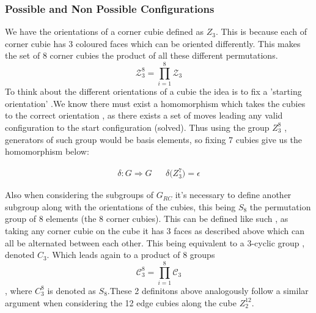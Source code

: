 \documentclass{article}
\begin{document}


\pagebreak
\subsubsection*{Possible and Non Possible Configurations}


We have the orientations of a corner cubie defined as $Z_3$.
This is because each of corner cubie has 3 coloured faces which can be oriented differently. 
This makes the set of 8 corner cubies the product of all these different permutations.\[\mathcal{Z}_{3}^8 = \prod_{i=1}^{8}\mathcal{Z}_{3}\]
To think about the different orientations of a cubie the idea is to fix a 'starting orientation' .We know there must exist a homomorphism which takes the cubies to the correct orientation , as there exists a set of moves leading any valid configuration to the start configuration (solved). Thus using the group $Z_{3}^{8}$ , generators of such group would be basis elements,  so fixing 7 cubies  give us the homomorphism below: 

\begin{align}
	\delta : G \Rightarrow G && \delta\mathcal({Z}_{3}^{7}) = \epsilon
\end{align}

Also when considering the subgroups of $G_{RC}$ it's necessary to define another subgroup along with the orientations of the cubies, this being $S_{8}$ the permutation group of 8 elements (the 8 corner cubies). This can be defined like such , as taking any corner cubie on the cube it has 3 faces as described above which can all be alternated between each other. This being equivalent to a 3-cyclic group , denoted $C_{3}$. Which leads again to a product of 8 groups \[\mathcal{C}_{3}^8 = \prod_{i=1}^{8}\mathcal{C}_{3}\], where $C_{3}^{8}$ is denoted as $S_{8}$.These 2 definitons above analogously follow a similar argument when considering the 12 edge cubies along the cube $Z^{12}_{2}$.
\end{document}
